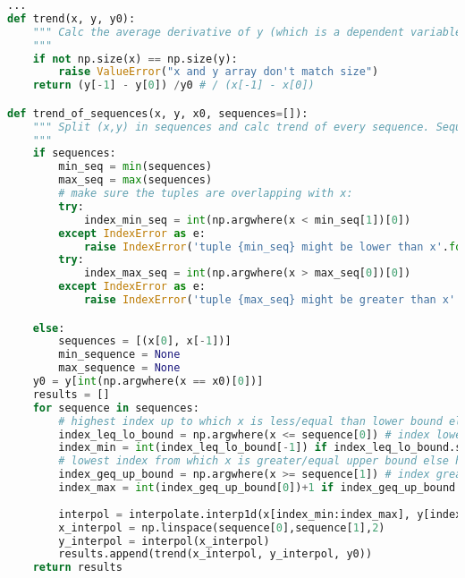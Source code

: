 \begin{lstlisting}[language=python, caption=Auszug aus \texttt{trendanalyse.py}, label=lst:Trendanalyse]
...
def trend(x, y, y0):
    """ Calc the average derivative of y (which is a dependent variable on x) related to y0
    """
    if not np.size(x) == np.size(y):
        raise ValueError("x and y array don't match size")
    return (y[-1] - y[0]) /y0 # / (x[-1] - x[0])

def trend_of_sequences(x, y, x0, sequences=[]):
    """ Split (x,y) in sequences and calc trend of every sequence. Sequences are given as list of tuples with x values. In Case a tuple is partly not in x the transient will be interpolated. 
    """
    if sequences:
        min_seq = min(sequences)
        max_seq = max(sequences)
        # make sure the tuples are overlapping with x:
        try:
            index_min_seq = int(np.argwhere(x < min_seq[1])[0])
        except IndexError as e:
            raise IndexError('tuple {min_seq} might be lower than x'.format(min_seq=repr(min_seq))) from e
        try:
            index_max_seq = int(np.argwhere(x > max_seq[0])[0])
        except IndexError as e:
            raise IndexError('tuple {max_seq} might be greater than x'.format(max_seq=repr(max_seq))) from e

    else:
        sequences = [(x[0], x[-1])]
        min_sequence = None
        max_sequence = None
    y0 = y[int(np.argwhere(x == x0)[0])]
    results = []
    for sequence in sequences:
        # highest index up to which x is less/equal than lower bound else lowest index of x:
        index_leq_lo_bound = np.argwhere(x <= sequence[0]) # index lower/equal lower bound
        index_min = int(index_leq_lo_bound[-1]) if index_leq_lo_bound.size > 0 else 0
        # lowest index from which x is greater/equal upper bound else highest index of x:
        index_geq_up_bound = np.argwhere(x >= sequence[1]) # index greater/equal upper bound
        index_max = int(index_geq_up_bound[0])+1 if index_geq_up_bound.size > 0 else None # NOTE: ``int(...)+1`` scince numpy _ex_cludes last element when slicing 
        
        interpol = interpolate.interp1d(x[index_min:index_max], y[index_min:index_max], fill_value='extrapolate')
        x_interpol = np.linspace(sequence[0],sequence[1],2)
        y_interpol = interpol(x_interpol)
        results.append(trend(x_interpol, y_interpol, y0))
    return results
\end{lstlisting}

